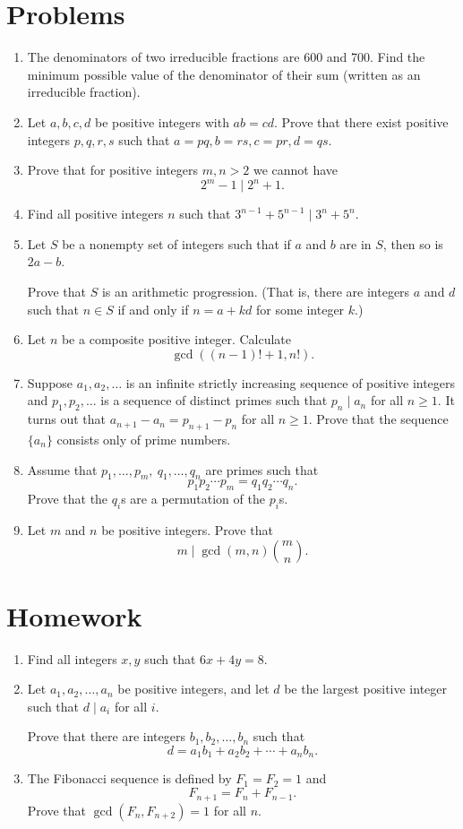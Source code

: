 \documentclass{article}
\begin{document}
\section{Problems}
\begin{enumerate}
	\item The denominators of two irreducible fractions are 600 and 700. Find the
	      minimum possible value of the denominator of their sum (written as an irreducible
	      fraction).
	\item Let $a,b,c,d$ be positive integers with $ab=cd$. Prove that there
	      exist positive integers $p,q,r,s$ such that \(a=pq,b=rs,c=pr,d=qs\).
	\item Prove that for positive integers $m,n>2$ we cannot have \[2^m-1\mid
		      2^n+1.\]
	\item Find all positive integers $n$ such that $3^{n-1}+5^{n-1}\mid
		      3^n+5^n$.
	\item Let $S$ be a nonempty set of integers such that if $a$ and $b$ are in $S$, then
	      so is $2a-b$.

	      Prove that $S$ is an arithmetic
	      progression. (That is, there are integers $a$ and $d$ such that $n\in S$ if
	      and only if
	      $n=a+kd$ for some integer $k$.)
	\item Let $n$ be a composite positive integer. Calculate
	      \[\gcd((n-1)!+1,n!).\]
	\item Suppose $a_1,a_2, \dots$ is an infinite strictly increasing sequence of
	      positive integers and $p_1, p_2, \dots$ is a sequence of distinct primes
	      such that $p_n \mid a_n$ for all $n \ge 1$. It turns out that
	      $a_{n+1}-a_n=p_{n+1}-p_n$ for all $n\ge 1$. Prove that the sequence $\{a_n\}$
	      consists only of prime numbers.
	\item Assume that $p_1,\ldots,p_m,\ q_1,\ldots,q_n$ are primes such that
	      \[p_1p_2\cdots p_m=q_1q_2\cdots q_n.\]
	      Prove that the $q_i$s are a permutation of the $p_i$s.
	\item Let $m$ and $n$ be positive integers. Prove that
	      \[m\mid\gcd(m,n)\binom mn.\]
\end{enumerate}
\newpage
\section{Homework}
\begin{enumerate}
	\item Find all integers $x,y$ such that $6x+4y=8$.
	\item Let $a_1,a_2,\ldots,a_n$ be positive integers, and let $d$ be the
	      largest positive integer such that $d\mid a_i$ for all $i$.

	      Prove that there are integers $b_1,b_2,\ldots,b_n$ such that
	      \[d=a_1b_1+a_2b_2+\cdots+a_n b_n.\]
	\item The Fibonacci sequence is defined by $F_1=F_2=1$ and
	      \[F_{n+1}=F_n+F_{n-1}.\]
	      Prove that $\gcd(F_n,F_{n+2})=1$ for all $n$.
\end{enumerate}
\end{document}
